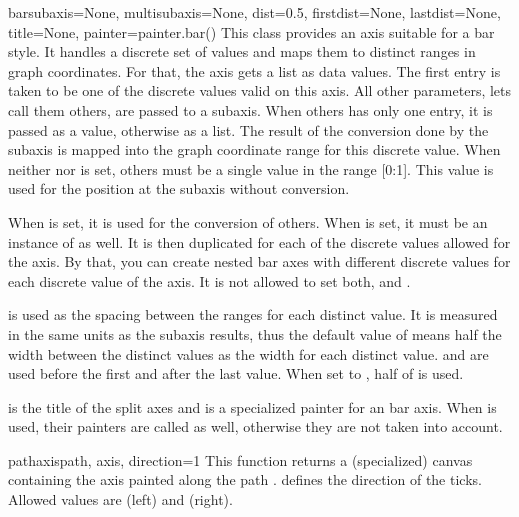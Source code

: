 \begin{classdesc}{bar}{subaxis=None, multisubaxis=None,
                       dist=0.5, firstdist=None, lastdist=None,
                       title=None, painter=painter.bar()}
  This class provides an axis suitable for a bar style. It handles a
  discrete set of values and maps them to distinct ranges in graph
  coordinates. For that, the axis gets a list as data values. The
  first entry is taken to be one of the discrete values valid on this
  axis. All other parameters, lets call them others, are passed to a
  subaxis. When others has only one entry, it is passed as a value,
  otherwise as a list. The result of the conversion done by the
  subaxis is mapped into the graph coordinate range for this discrete
  value. When neither  nor  is set,
  others must be a single value in the range [0:1]. This value is used 
  for the position at the subaxis without conversion.

  When  is set, it is used for the conversion of others.
  When  is set, it must be an instance of 
  as well. It is then duplicated for each of the discrete values
  allowed for the axis. By that, you can create nested bar axes with
  different discrete values for each discrete value of the axis. It
  is not allowed to set both,  and .

   is used as the spacing between the ranges for each
  distinct value. It is measured in the same units as the subaxis
  results, thus the default value of  means half the width
  between the distinct values as the width for each distinct value.
   and  are used before the first and
  after the last value. When set to , half of 
  is used.

   is the title of the split axes and  is a
  specialized painter for an bar axis. When  is
  used, their painters are called as well, otherwise they are not
  taken into account.
\end{classdesc}

\begin{funcdesc}{pathaxis}{path, axis, direction=1}
  This function returns a (specialized) canvas containing the axis
   painted along the path . 
  defines the direction of the ticks. Allowed values are 
  (left) and  (right).
\end{funcdesc}

